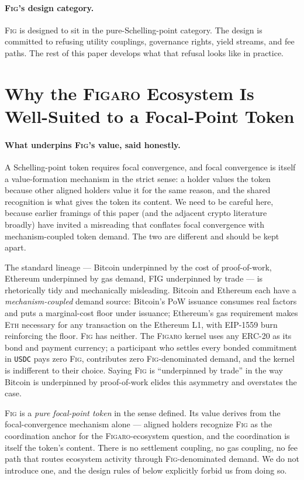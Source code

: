 \documentclass[11pt,a4paper]{article}
\theoremstyle{definition}
\theoremstyle{remark}
\newcommand{\figaro}{\textsc{Figaro}}
\newcommand{\fig}{\textsc{Fig}}
\begin{document}
\paragraph{\fig{}'s design category.}
\fig{} is designed to sit in the pure-Schelling-point category.
The design is committed to refusing utility couplings, governance
rights, yield streams, and fee paths. The rest of this paper
develops what that refusal looks like in practice.

\section{Why the \figaro{} Ecosystem Is Well-Suited to a Focal-Point Token}
\label{sec:ecosystem-need}

\paragraph{What underpins \fig{}'s value, said honestly.}
A Schelling-point token requires focal convergence, and focal
convergence is itself a value-formation mechanism in the
strict sense: a holder values the token because other aligned
holders value it for the same reason, and the shared
recognition is what gives the token its content. We need to be
careful here, because earlier framings of this paper (and the
adjacent crypto literature broadly) have invited a misreading
that conflates focal convergence with mechanism-coupled token
demand. The two are different and should be kept apart.

The standard lineage --- Bitcoin underpinned by the cost of
proof-of-work, Ethereum underpinned by gas demand, FIG
underpinned by trade --- is rhetorically tidy and mechanically
misleading. Bitcoin and Ethereum each have a
\emph{mechanism-coupled} demand source: Bitcoin's PoW
issuance consumes real factors and puts a marginal-cost floor
under issuance; Ethereum's gas requirement makes \textsc{Eth}
necessary for any transaction on the Ethereum L1, with
EIP-1559 burn reinforcing the floor. \fig{} has neither.
The \figaro{} kernel uses any ERC-20 as its bond and payment
currency; a participant who settles every bonded commitment
in \texttt{USDC} pays zero \fig{}, contributes zero
\fig{}-denominated demand, and the kernel is indifferent to
their choice. Saying \fig{} is ``underpinned by trade'' in
the way Bitcoin is underpinned by proof-of-work elides this
asymmetry and overstates the case.

\fig{} is a \emph{pure focal-point token} in the sense
 defined. Its value derives from
the focal-convergence mechanism alone --- aligned holders
recognize \fig{} as the coordination anchor for the
\figaro{}-ecosystem question, and the coordination is itself
the token's content. There is no settlement coupling, no gas
coupling, no fee path that routes ecosystem activity through
\fig{}-denominated demand. We do not introduce one, and the
design rules of  below explicitly
forbid us from doing so.
\end{document}
